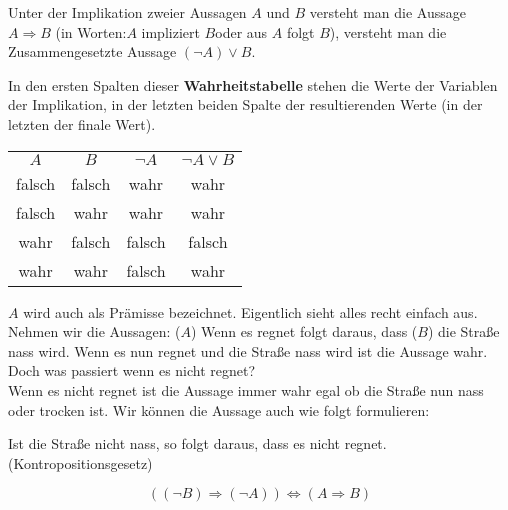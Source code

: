 \begin{definition}[Implikation]
Unter der Implikation zweier Aussagen $A$ und $B$ versteht man die Aussage $A \Rightarrow B$ (in Worten:\glqq $A$ impliziert $B$\grqq oder \glqq aus $A$ folgt $B$\grqq ), versteht man die Zusammengesetzte Aussage $ (\neg A) \lor B$.
\end{definition}
In den ersten Spalten dieser \textbf{Wahrheitstabelle} stehen die Werte der Variablen der Implikation, in der letzten beiden Spalte der resultierenden Werte (in der letzten der finale Wert).
\begin{center}
\begin{tabular}{c|c||c||c}
$A$& $B$ &$\neg A$&  $\neg A \lor B$  \\ 
 \cellcolor{ared}falsch &  \cellcolor{ared}falsch & \cellcolor{agreen}wahr  & \cellcolor{agreen}wahr  \\ 
 \cellcolor{ared}falsch & \cellcolor{agreen}wahr & \cellcolor{agreen}wahr  &  \cellcolor{agreen}wahr  \\ 
\cellcolor{agreen}wahr &  \cellcolor{ared}falsch & \cellcolor{ared} falsch  &  \cellcolor{ared}falsch  \\ 
\cellcolor{agreen}wahr & \cellcolor{agreen}wahr & \cellcolor{ared} falsch  &  \cellcolor{agreen}wahr  \\ 
\hline
\end{tabular}
\end{center}

$A$ wird auch als Prämisse bezeichnet. Eigentlich sieht alles recht einfach aus. Nehmen wir die Aussagen: ($A$) \glqq Wenn es regnet folgt daraus, dass ($B$) die Stra{ß}e nass wird\grqq . Wenn es nun regnet und die Stra{ß}e nass wird ist die Aussage wahr. Doch was passiert wenn es nicht regnet?\\
Wenn es nicht regnet ist die Aussage immer wahr egal ob die Stra{ß}e nun nass oder trocken ist.
Wir können die Aussage auch wie folgt formulieren:
\begin{center}
\glqq Ist die Stra{ß}e nicht nass, so folgt daraus, dass es nicht regnet.\grqq\\ (Kontropositionsgesetz)
\end{center}
\begin{equation*}
((\neg B) \Rightarrow (\neg A)) \iff (A \Rightarrow B)
\end{equation*}

